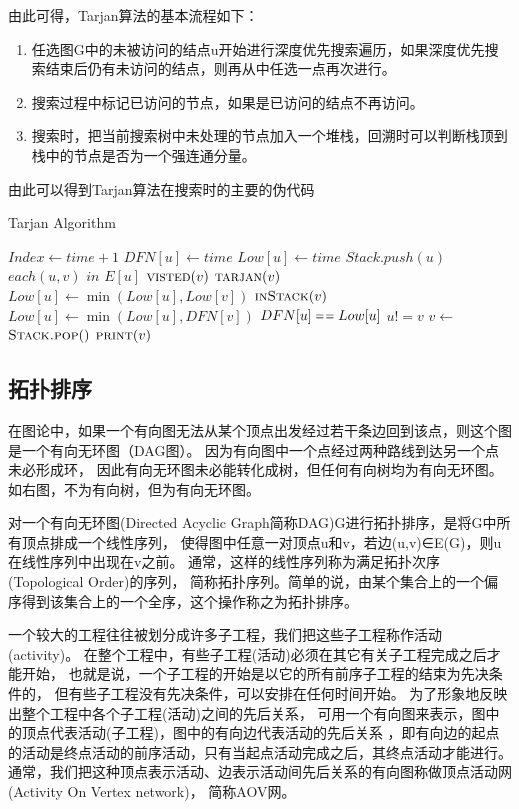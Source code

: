 由此可得，Tarjan算法的基本流程如下：
\begin{enumerate}
\item 任选图G中的未被访问的结点u开始进行深度优先搜索遍历，如果深度优先搜索结束后仍有未访问的结点，则再从中任选一点再次进行。
\item 搜索过程中标记已访问的节点，如果是已访问的结点不再访问。
\item 搜索时，把当前搜索树中未处理的节点加入一个堆栈，回溯时可以判断栈顶到栈中的节点是否为一个强连通分量。
\end{enumerate}

由此可以得到Tarjan算法在搜索时的主要的伪代码
\begin{algorithm} 
\caption {Tarjan Algorithm} 
\begin{codebox}
\li	$Index \leftarrow time + 1$
\li	$DFN[u] \leftarrow time$
\li	$Low[u] \leftarrow time$
\li	$Stack.push(u)$
\li	\For $each (u, v)$ $in$ $E[u]$
\li		\Do  \If $\textnormal{\scshape visted}(v)$
\li			\Then
				$\textnormal{\scshape tarjan}(v)$                  
\li            			$Low[u] \leftarrow \min(Low[u], Low[v])$
\li        		 \ElseIf $\textnormal{\scshape inStack}(v)$ 
\li            			\Then $Low[u] \leftarrow \min(Low[u], DFN[v])$
			\End
		\End
\li	\If $DFN[u] \isequal Low[u]$
\li		\Then \While $u != v$
\li				\Do $v \leftarrow$ $\textnormal{\scshape Stack.pop}()$                  
\li            				$\textnormal{\scshape print}(v)$
				\End 
		\End
\end{codebox}
\end{algorithm} 
\subsection{拓扑排序}
在图论中，如果一个有向图无法从某个顶点出发经过若干条边回到该点，则这个图是一个有向无环图（DAG图）。
因为有向图中一个点经过两种路线到达另一个点未必形成环，
因此有向无环图未必能转化成树，但任何有向树均为有向无环图。如右图，不为有向树，但为有向无环图。

对一个有向无环图(Directed Acyclic Graph简称DAG)G进行拓扑排序，是将G中所有顶点排成一个线性序列，
使得图中任意一对顶点u和v，若边(u,v)∈E(G)，则u在线性序列中出现在v之前。
通常，这样的线性序列称为满足拓扑次序(Topological Order)的序列，
简称拓扑序列。简单的说，由某个集合上的一个偏序得到该集合上的一个全序，这个操作称之为拓扑排序。

一个较大的工程往往被划分成许多子工程，我们把这些子工程称作活动(activity)。
在整个工程中，有些子工程(活动)必须在其它有关子工程完成之后才能开始，
也就是说，一个子工程的开始是以它的所有前序子工程的结束为先决条件的，
但有些子工程没有先决条件，可以安排在任何时间开始。
为了形象地反映出整个工程中各个子工程(活动)之间的先后关系，
可用一个有向图来表示，图中的顶点代表活动(子工程)，图中的有向边代表活动的先后关系
，即有向边的起点的活动是终点活动的前序活动，只有当起点活动完成之后，其终点活动才能进行。
通常，我们把这种顶点表示活动、边表示活动间先后关系的有向图称做顶点活动网(Activity On Vertex network)，
简称AOV网。

